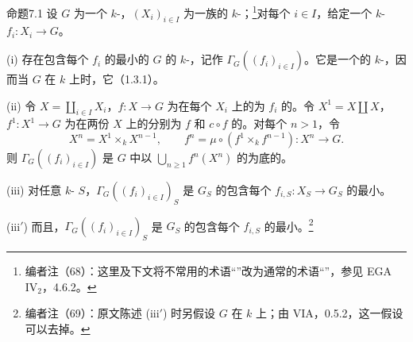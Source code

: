 \begin{SGAresult}{命题}{7.1}
设 $G$ 为一个 $k$-，$(X_i)_{i\in I}$ 为一族的 $k$-；\footnote{编者注（68）：这里及下文将不常用的术语“”改为通常的术语“”，参见 EGA $\mathrm{IV}_2$，4.6.2。}对每个 $i\in I$，给定一个 $k$- $f_i:X_i\to G$。

(i) 存在包含每个 $f_i$ 的最小的 $G$ 的 $k$-，记作 $\Gamma_G((f_i)_{i\in I})$。它是一个的 $k$-，因而当 $G$ 在 $k$ 上时，它（1.3.1）。

(ii) 令 $X=\coprod_{i\in I}X_i$，$f:X\to G$ 为在每个 $X_i$ 上的为 $f_i$ 的。令 $X^1=X\coprod X$，$f^1:X^1\to G$ 为在两份 $X$ 上的分别为 $f$ 和 $c\circ f$ 的。对每个 $n>1$，令
\[
X^n=X^1\times_k X^{n-1},\qquad
f^n=\mu\circ(f^1\times_k f^{n-1}):X^n\longrightarrow G.
\]
则 $\Gamma_G((f_i)_{i\in I})$ 是 $G$ 中以 $\bigcup_{n\geq1}f^n(X^n)$ 的为底的。

(iii) 对任意 $k$- $S$，$\Gamma_G((f_i)_{i\in I})_S$ 是 $G_S$ 的包含每个 $f_{i,S}:X_S\to G_S$ 的最小。

(iii$'$) 而且，$\Gamma_G((f_i)_{i\in I})_S$ 是 $G_S$ 的包含每个 $f_{i,S}$ 的最小。\footnote{编者注（69）：原文陈述 (iii$'$) 时另假设 $G$ 在 $k$ 上；由 VIA，0.5.2，这一假设可以去掉。}
\end{SGAresult}
